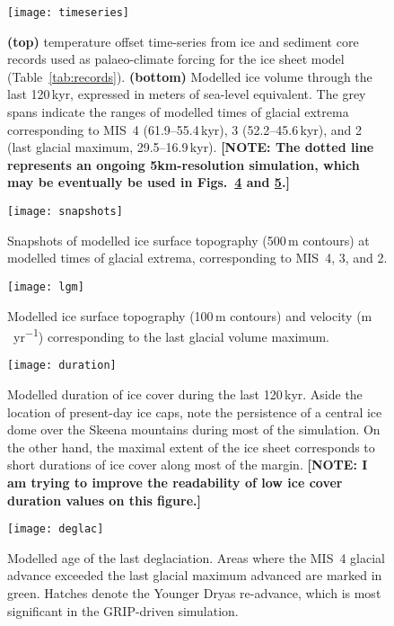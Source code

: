 \documentclass[tc, ms]{copernicus}
\newcommand{\note}[1]{\textbf{[NOTE: #1]}}
\begin{document}
\begin{figure}
  \texttt{[image: timeseries]}
  \caption{\textbf{(top)} temperature offset time-series from ice and sediment
           core records used as palaeo-climate forcing for the ice sheet model
           (Table~\ref{tab:records}). \textbf{(bottom)} Modelled ice volume
           through the last 120\,\unit{kyr}, expressed in meters of sea-level
           equivalent. The grey spans indicate the ranges of modelled times of
           glacial extrema corresponding to MIS~4 (61.9--55.4\,\unit{kyr}), 3
           (52.2--45.6\,\unit{kyr}), and 2 (last glacial maximum,
           29.5--16.9\,\unit{kyr}).
           \note{The dotted line represents an ongoing 5km-resolution
           simulation, which may be eventually be used in
           Figs.~\ref{fig:duration} and \ref{fig:deglac}.}}
  \label{fig:timeseries}
\end{figure}

\begin{figure}
  \texttt{[image: snapshots]}
  \caption{Snapshots of modelled ice surface topography (500\,\unit{m}
           contours) at modelled times of glacial
           extrema, corresponding to MIS~4, 3, and 2.}
  \label{fig:snapshots}
\end{figure}

\begin{figure}
  \texttt{[image: lgm]}
  \caption{Modelled ice surface topography (100\,\unit{m} contours) and
           velocity (\unit{m\,yr^{-1}}) corresponding to the last glacial
           volume maximum.}
  \label{fig:lgm}
\end{figure}

\begin{figure}
  \texttt{[image: duration]}
  \caption{Modelled duration of ice cover during the last 120\,\unit{kyr}.
           Aside the location of present-day ice caps, note the persistence of
           a central ice dome over the Skeena mountains during most of the
           simulation. On the other hand, the maximal extent of the ice sheet
           corresponds to short durations of ice cover along most of the
           margin.
           \note{I am trying to improve the readability of low ice cover
           duration values on this figure.}}
  \label{fig:duration}
\end{figure}

\begin{figure}
  \texttt{[image: deglac]}
  \caption{Modelled age of the last deglaciation. Areas where the MIS~4 glacial
           advance exceeded the last glacial maximum advanced are marked in
           green. Hatches denote the Younger Dryas re-advance, which is most
           significant in the GRIP-driven simulation.}
  \label{fig:deglac}
\end{figure}

\end{document}
